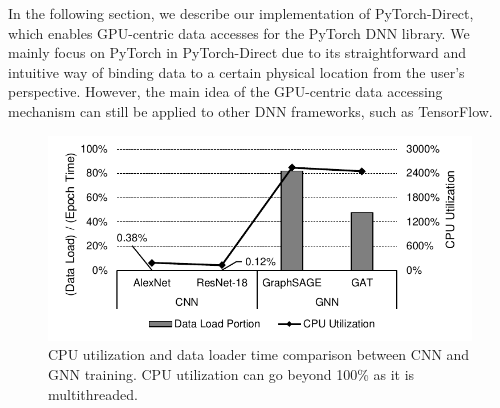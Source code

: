 In the following section, we describe our implementation of PyTorch-Direct, which enables GPU-centric data accesses for the PyTorch DNN library.
We mainly focus on PyTorch in PyTorch-Direct due to its straightforward and intuitive way of binding data to a certain physical location from the user's perspective.
However, the main idea of the GPU-centric data accessing mechanism can still be applied to other DNN frameworks, such as TensorFlow.




\begin{figure}[!htbp]
    \centering
    \includegraphics[width=\linewidth]{figures/PyDArXiv/motivation.pdf}
    \caption{CPU utilization and data loader time comparison between CNN and GNN training. CPU utilization can go beyond 100\% as it is multithreaded.}
    \label{fig:pyd_motivation}
\end{figure}



